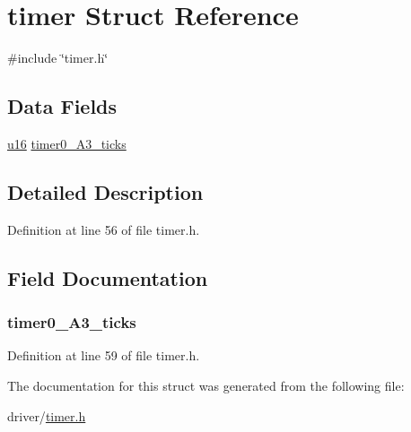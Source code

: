 \hypertarget{structtimer}{\section{timer \-Struct \-Reference}
\label{structtimer}
}


{\ttfamily \#include \char`\"{}timer.\-h\char`\"{}}

\subsection*{\-Data \-Fields}
\begin{DoxyCompactItemize}
\item 
\hyperlink{main__ED__BM_8c_a9e6c91d77e24643b888dbd1a1a590054}{u16} \hyperlink{structtimer_a7fb57440f88930f7509cf89d57fa6b97}{timer0\-\_\-\-A3\-\_\-ticks}
\end{DoxyCompactItemize}


\subsection{\-Detailed \-Description}


\-Definition at line 56 of file timer.\-h.



\subsection{\-Field \-Documentation}
\hypertarget{structtimer_a7fb57440f88930f7509cf89d57fa6b97}{
\subsubsection[{timer0\-\_\-\-A3\-\_\-ticks}]{ {\bf timer0\-\_\-\-A3\-\_\-ticks}}}\label{structtimer_a7fb57440f88930f7509cf89d57fa6b97}


\-Definition at line 59 of file timer.\-h.



\-The documentation for this struct was generated from the following file\-:\begin{DoxyCompactItemize}
\item 
driver/\hyperlink{timer_8h}{timer.\-h}\end{DoxyCompactItemize}
